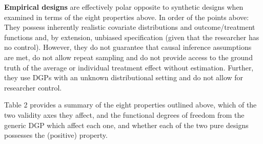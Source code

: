 \documentclass[../main.tex]{subfiles}
\begin{document}
\vspace{\baselineskip}
\textbf{Empirical designs} are effectively polar opposite to synthetic designs when examined in terms of the eight properties above. In order of the points above: They possess inherently realistic covariate distributions and outcome/treatment functions and, by extension, unbiased specification (given that the researcher has no control). However, they do not guarantee that causal inference assumptions are met, do not allow repeat sampling and do not provide access to the ground truth of the average or individual treatment effect without estimation. Further, they use DGPs with an unknown distributional setting and do not allow for researcher control.\par


\vspace{\baselineskip}
Table 2 provides a summary of the eight properties outlined above, which of the two validity axes they affect, and the functional degrees of freedom from the generic DGP which affect each one, and whether each of the two pure designs possesses the (positive) property.\par


\vspace{\baselineskip}


\end{document}
